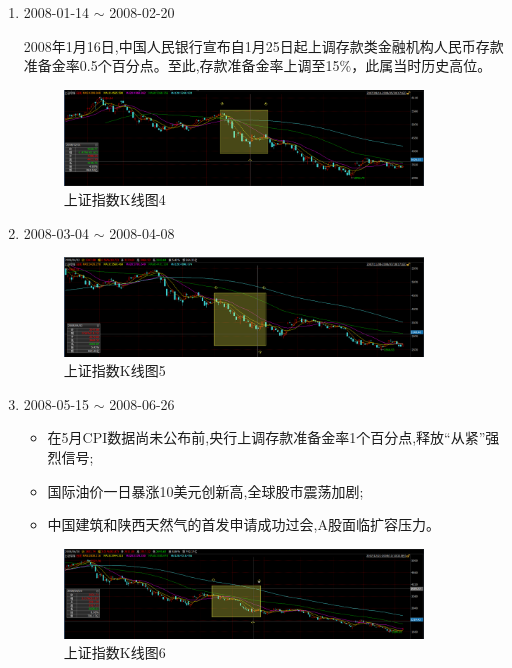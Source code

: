 \documentclass[12pt,a4paper]{article}
\begin{document}
\begin{enumerate}[1)]
\item 2008-01-14 $\sim$ 2008-02-20

2008年1月16日,中国人民银行宣布自1月25日起上调存款类金融机构人民币存款准备金率0.5个百分点。至此,存款准备金率上调至15\%，此属当时历史高位。

	\begin{figure}[H]
		\centering
		\includegraphics[width=0.9\textwidth]{img/14.png}%
		\caption{上证指数K线图4}
	\end{figure}
	
\item 2008-03-04 $\sim$ 2008-04-08

	\begin{figure}[H]
		\centering
		\includegraphics[width=0.9\textwidth]{img/15.png}%
		\caption{上证指数K线图5}
	\end{figure}

\item 2008-05-15 $\sim$ 2008-06-26 
	\begin{itemize}
		\item 在5月CPI数据尚未公布前,央行上调存款准备金率1个百分点,释放“从紧”强烈信号;
		\item   国际油价一日暴涨10美元创新高,全球股市震荡加剧;
		\item 中国建筑和陕西天然气的首发申请成功过会,A股面临扩容压力。
	
	\end{itemize}
	

	\begin{figure}[H]
		\centering
		\includegraphics[width=0.9\textwidth]{img/16.png}%
		\caption{上证指数K线图6}
	\end{figure}


\end{enumerate}
\end{document}
